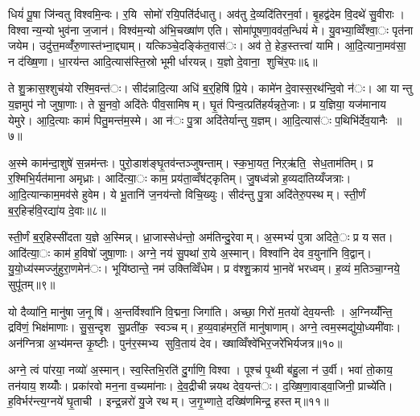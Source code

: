 धियं॑ पू॒षा जि॑न्वतु विश्वमि॒न्वः। र॒यि सोमो॑ रयि॒पति॑र्दधातु। अव॑तु दे॒व्यदि॑तिरन॒र्वा। बृ॒हद्व॑देम वि॒दथे॑ सु॒वीराः। विश्वान्य॒न्यो भुव॑ना ज॒जान॑। विश्व॑म॒न्यो अ॑भि॒चख्षा॑ण एति। सोमा॑पूषणा॒वव॑त॒न्धियं॑ मे। यु॒वभ्या॒व्विँश्वा॒ः पृत॑ना जयेम। उदु॑त्त॒मव्वँ॑रु॒णास्त॑भ्ना॒द्द्याम्। यत्किञ्चे॒दङ्कि॑त॒वास॑ः। अव॑ ते॒ हेड॒स्तत्त्वा॑ यामि। आ॒दि॒त्याना॒मव॑सा॒ न द॑ख्षि॒णा। धा॒रय॑न्त आदि॒त्यास॑स्ति॒स्रो भूमीर्धारयन्न्। य॒ज्ञो दे॒वाना॒ शुचि॑र॒पः॥६॥


ते शु॒क्रास॒श्शुच॑यो रश्मि॒वन्त॑ः। सीद॑न्नादि॒त्या अधि॑ ब॒र्॒हिषि॑ प्रि॒ये। कामे॑न दे॒वास्स॒रथ॑न्दि॒वो न॑ः। आ यान्तु य॒ज्ञमुप॑ नो जुषा॒णाः। ते सू॒नवो॒ अदि॑तेः पीव॒सामिषम्। घृ॒तं पिन्व॒त्प्रति॑हर्यन्नृते॒जाः। प्र य॒ज्ञिया॒ यज॑मानाय येमुरे। आ॒दि॒त्याः कामं॑ पितु॒मन्त॑म॒स्मे। आ न॑ः पु॒त्रा अदि॑तेर्यान्तु य॒ज्ञम्। आ॒दि॒त्यास॑ः प॒थिभि॑र्देव॒यानैः ॥७॥

अ॒स्मे काम॑न्दा॒शुषे॑ स॒न्नम॑न्तः। पुरो॒डाश॑ङ्घृ॒तव॑न्तञ्जुषन्ताम्। स्क॒भा॒यत॒ निऱ्ऋ॑ति॒ सेध॒ताम॑तिम्। प्र र॒श्मिभि॒र्यत॑माना अमृध्राः। आदि॑त्या॒ः काम॒ प्रय॑ता॒व्वँष॑ट्कृतिम्। जु॒षध्व॑न्नो ह॒व्यदा॑तिय्यँजत्राः। आ॒दि॒त्यान्काम॒मव॑से हुवेम। ये भू॒तानि॑ ज॒नय॑न्तो विचि॒ख्युः। सीद॑न्तु पु॒त्रा अदि॑तेरु॒पस्थम्। स्ती॒र्णं ब॒र्॒हिऱ्ह॑वि॒रद्या॑य दे॒वाः॥८॥

स्ती॒र्णं ब॒र्॒हिस्सी॑दता य॒ज्ञे अ॒स्मिन्न्। ध्रा॒जास्सेध॑न्तो॒ अम॑तिन्दु॒रेवाम्। अ॒स्मभ्यं॑ पुत्रा अदिते॒ः प्र यसत। आदि॑त्या॒ः काम॑ ह॒विषो॑ जुषा॒णाः। अग्ने॒ नय॑ सु॒पथा॑ रा॒ये अ॒स्मान्। विश्वा॑नि देव व॒युना॑नि वि॒द्वान्। यु॒यो॒ध्य॑स्मज्जु॑हुरा॒णमेन॑ः। भूयि॑ष्ठान्ते॒ नम॑ उक्तिव्विँधेम। प्र व॑श्शु॒क्राय॑ भा॒नवे॑ भरध्वम्। ह॒व्यं म॒तिञ्चा॒ग्नये॒ सुपू॑तम्॥९॥

यो दैव्या॑नि॒ मानु॑षा ज॒नूषि॑। अ॒न्तर्विश्वा॑नि वि॒द्मना॒ जिगा॑ति। अच्छा॒ गिरो॑ म॒तयो॑ देव॒यन्तीः। अ॒ग्निय्यँ॑न्ति॒ द्रवि॑णं॒ भिक्ष॑माणाः। सु॒स॒न्दृश सु॒प्रती॑क॒ स्वञ्चम्। ह॒व्य॒वाह॑मर॒तिं मानु॑षाणाम्। अग्ने॒ त्वम॒स्मद्यु॑यो॒ध्यमी॑वाः। अन॑ग्नित्रा अ॒भ्य॑मन्त कृ॒ष्टीः। पुन॑र॒स्मभ्य सुवि॒ताय॑ देव। ख्षाव्विँश्वे॑भिर॒जरे॑भिर्यजत्र॥१०॥

अग्ने॒ त्वं पा॑रया॒ नव्यो॑ अ॒स्मान्। स्व॒स्तिभि॒रति॑ दु॒र्गाणि॒ विश्वा। पूश्च॑ पृ॒थ्वी ब॑हु॒ला न॑ उ॒र्वी। भवा॑ तो॒काय॒ तन॑याय॒ शय्योँः। प्रका॑रवो मन॒ना व॒च्यमा॑नाः। दे॒व॒द्रीचीन्नयथ देव॒यन्त॑ः। द॒ख्षि॒णा॒वाड्वा॒जिनी॒ प्राच्ये॑ति। ह॒विर्भर॑न्त्य॒ग्नये॑ घृ॒ताची। इन्द्र॒न्नरो॑ यु॒जे रथम्। ज॒गृ॒भ्णाते॒ दख्षि॑णमिन्द्र॒ हस्तम्॥११॥

